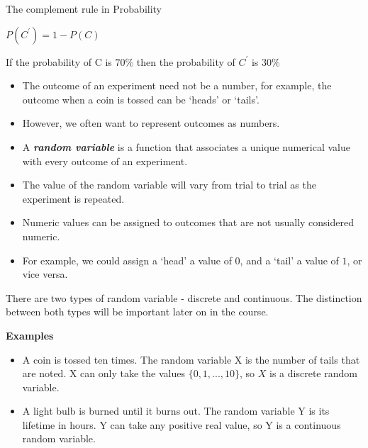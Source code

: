 \documentclass[12pt]{report}
\begin{document}
		
		
		The complement rule in Probability
		
		$P(C^{\prime}) = 1- P(C)$
		
		
		
		If the probability of C is $70 \%$ then the probability of $C^{\prime}$ is $30\%$

{\LARGE
	\begin{itemize} \item The outcome of an experiment need not be a number, for example, the outcome when a coin is tossed can be `heads' or `tails'. \item
		However, we often want to represent outcomes as numbers. \item
		A \textbf{\emph{random variable}} is a function that associates a unique numerical value with every outcome of an experiment.
		\item The value of the random variable will vary from trial to trial as the experiment is repeated.
		\item Numeric values can be assigned to outcomes that are not usually considered numeric. \item For example, we could assign a `head' a value of $0$, and a `tail' a value of $1$, or vice versa.
	\end{itemize}
}
{\LARGE
	There are two types of random variable - discrete and continuous. The distinction between both types will be important later on in the course.\\ \bigskip
	
	\textbf{Examples}
	\begin{itemize}
		\item A coin is tossed ten times. The random variable X is the number of tails that are noted.
		X can only take the values $\{0, 1, ..., 10\}$, so $X$ is a discrete random variable.
		\item A light bulb is burned until it burns out. The random variable Y is its lifetime in hours.
		Y can take any positive real value, so Y is a continuous random variable.
	\end{itemize}
}
\end{document}
